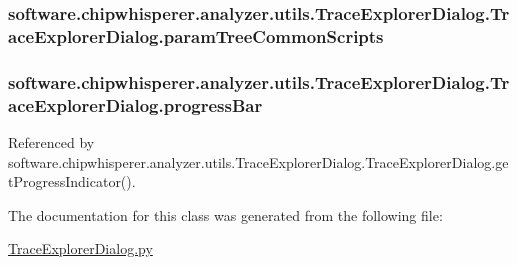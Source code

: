 \hypertarget{classsoftware_1_1chipwhisperer_1_1analyzer_1_1utils_1_1TraceExplorerDialog_1_1TraceExplorerDialog_a4e2a5de8ccc90c212ce348ba063fa473}{}
\subsubsection[{param\+Tree\+Common\+Scripts}]{\setlength{\rightskip}{0pt plus 5cm}software.\+chipwhisperer.\+analyzer.\+utils.\+Trace\+Explorer\+Dialog.\+Trace\+Explorer\+Dialog.\+param\+Tree\+Common\+Scripts}\label{classsoftware_1_1chipwhisperer_1_1analyzer_1_1utils_1_1TraceExplorerDialog_1_1TraceExplorerDialog_a4e2a5de8ccc90c212ce348ba063fa473}
\hypertarget{classsoftware_1_1chipwhisperer_1_1analyzer_1_1utils_1_1TraceExplorerDialog_1_1TraceExplorerDialog_a3cf5a03336ad8100cb71978499515bcc}{}
\subsubsection[{progress\+Bar}]{\setlength{\rightskip}{0pt plus 5cm}software.\+chipwhisperer.\+analyzer.\+utils.\+Trace\+Explorer\+Dialog.\+Trace\+Explorer\+Dialog.\+progress\+Bar}\label{classsoftware_1_1chipwhisperer_1_1analyzer_1_1utils_1_1TraceExplorerDialog_1_1TraceExplorerDialog_a3cf5a03336ad8100cb71978499515bcc}


Referenced by software.\+chipwhisperer.\+analyzer.\+utils.\+Trace\+Explorer\+Dialog.\+Trace\+Explorer\+Dialog.\+get\+Progress\+Indicator().



The documentation for this class was generated from the following file\+:\begin{DoxyCompactItemize}
\item 
\hyperlink{TraceExplorerDialog_8py}{Trace\+Explorer\+Dialog.\+py}\end{DoxyCompactItemize}
